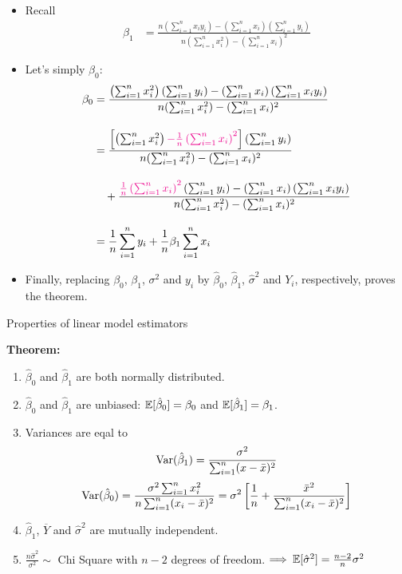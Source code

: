 \begin{frame}[fragile]
\small
\begin{itemize}
	\item[] Recall
	\begin{align*}
		\beta_1 & = \frac{ n \left(\sum_{i=1}^n x_iy_i\right)-\left(\sum_{i=1}^n x_i\right) \left(\sum_{i=1}^n y_i\right)}{n(\sum_{i=1}^n x_i^2) - (\sum_{i=1}^n x_i)^2}
	\end{align*}
	\item[] Let's simply $\beta_0$:
		\begin{align*}
			\beta_0 & = \frac{\left(\sum_{i=1}^n x_i^2\right) \left(\sum_{i=1}^n y_i\right) - \left(\sum_{i=1}^n x_i\right) \left(\sum_{i=1}^n x_iy_i\right)}{n(\sum_{i=1}^n x_i^2) - (\sum_{i=1}^n x_i)^2}\\[1em]
			        & = \frac{\left[\left(\sum_{i=1}^n x_i^2\right) \textcolor{magenta}{-\frac{1}{n}\left(\sum_{i=1}^n x_i\right)^2}\right]\left(\sum_{i=1}^n y_i\right)}{n(\sum_{i=1}^n x_i^2) - (\sum_{i=1}^n x_i)^2}\\[1em]
			        & \quad + \frac{\textcolor{magenta}{\frac{1}{n}\left(\sum_{i=1}^n x_i\right)^2}\left(\sum_{i=1}^n y_i\right)- \left(\sum_{i=1}^n x_i\right) \left(\sum_{i=1}^n x_iy_i\right)}{n(\sum_{i=1}^n x_i^2) - (\sum_{i=1}^n x_i)^2}\\[1em]
							& = \frac{1}{n} \sum_{i=1}^n y_i +  \frac{1}{n} \beta_1 \sum_{i=1}^n x_i
		\end{align*}
	\item[]	Finally, replacing $\beta_0$, $\beta_1$, $\sigma^2$ and $y_i$ by  $\hat{\beta}_0$, $\hat{\beta}_1$, $ \hat{\sigma}^2$ and $Y_i$, respectively, proves the theorem. \myEnd
\end{itemize}
\end{frame}
\begin{frame}{Properties of linear model estimators}

	{\bf Theorem:}
\begin{enumerate}
\item $\hat\beta_0$ and $\hat\beta_1$ are both normally distributed.
\item $\hat\beta_0$ and $\hat\beta_1$ are unbiased: $\mathbb{E}[\hat\beta_0]=\beta_0$ and $\mathbb{E}[\hat\beta_1]=\beta_1$.
\item Variances are eqal to
\[
\text{Var}(\hat\beta_1) =  \frac{\sigma^2}{\sum_{i=1}^n(x-\bar x)^2}
\]
\[
\text{Var}(\hat\beta_0) =  \frac{\sigma^2 \sum_{i=1}^n x_i^2}{n\sum_{i=1}^n (x_i-\bar x)^2}  =\sigma^2 \left[ \frac{1}{n} +  \frac{\bar x^2}{\sum_{i=1}^n (x_i-\bar x)^2} \right]
\]
\vfill
\item $\hat\beta_1$, $\overline{Y}$ and $\hat\sigma^2$ are mutually independent.
\item $ \frac{n\hat \sigma^2}{\sigma^2}\sim$ Chi Square with $n-2$ degrees of freedom. \hfill $\Longrightarrow \: \mathbb{E}[\hat{\sigma}^2]= \frac{n-2}{n}\sigma^2$
\end{enumerate}
\end{frame}
